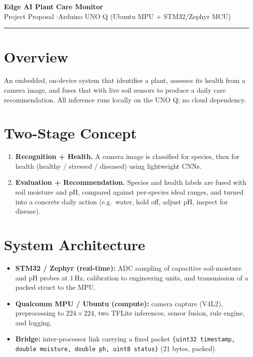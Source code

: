 \documentclass[10pt]{article}
\begin{document}
\begin{center}
{\LARGE\bfseries Edge AI Plant Care Monitor}\\[2pt]
{\normalsize Project Proposal \quad$\cdot$\quad Arduino UNO Q (Ubuntu MPU + STM32/Zephyr MCU)}
\end{center}

\vspace{2pt}
\hrule
\vspace{6pt}

\section*{Overview}
An embedded, on-device system that identifies a plant, assesses its health from a camera image,
and fuses that with live soil sensors to produce a daily care recommendation. All inference runs
locally on the UNO Q; no cloud dependency.

\section*{Two-Stage Concept}
\begin{enumerate}[label=\textbf{\arabic*.}]
  \item \textbf{Recognition + Health.} A camera image is classified for species, then for health
        (healthy / stressed / diseased) using lightweight CNNs.
  \item \textbf{Evaluation + Recommendation.} Species and health labels are fused with soil
        moisture and pH, compared against per-species ideal ranges, and turned into a concrete
        daily action (e.g.\ water, hold off, adjust pH, inspect for disease).
\end{enumerate}

\section*{System Architecture}
\begin{itemize}
  \item \textbf{STM32 / Zephyr (real-time):} ADC sampling of capacitive soil-moisture and pH probes
        at $1\,\text{Hz}$, calibration to engineering units, and transmission of a packed struct to the MPU.
  \item \textbf{Qualcomm MPU / Ubuntu (compute):} camera capture (V4L2), preprocessing to
        $224\times224$, two TFLite inferences, sensor fusion, rule engine, and logging.
  \item \textbf{Bridge:} inter-processor link carrying a fixed packet
        \texttt{\{uint32 timestamp, double moisture, double ph, uint8 status\}} (21 bytes, packed).
\end{itemize}
\end{document}
